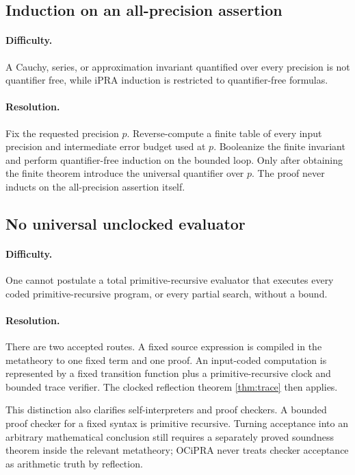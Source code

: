 \subsection{Induction on an all-precision assertion}

\paragraph{Difficulty.}
A Cauchy, series, or approximation invariant quantified over every precision is not quantifier free, while iPRA induction is restricted to quantifier-free formulas.

\paragraph{Resolution.}
Fix the requested precision $p$.  Reverse-compute a finite table of every input precision and intermediate error budget used at $p$.  Booleanize the finite invariant and perform quantifier-free induction on the bounded loop.  Only after obtaining the finite theorem introduce the universal quantifier over $p$.  The proof never inducts on the all-precision assertion itself.

\subsection{No universal unclocked evaluator}

\paragraph{Difficulty.}
One cannot postulate a total primitive-recursive evaluator that executes every coded primitive-recursive program, or every partial search, without a bound.

\paragraph{Resolution.}
There are two accepted routes.  A fixed source expression is compiled in the metatheory to one fixed  term and one proof.  An input-coded computation is represented by a fixed transition function plus a primitive-recursive clock and bounded trace verifier.  The clocked reflection theorem \cref{thm:trace} then applies.

This distinction also clarifies self-interpreters and proof checkers.  A bounded proof checker for a fixed syntax is primitive recursive.  Turning acceptance into an arbitrary mathematical conclusion still requires a separately proved soundness theorem inside the relevant metatheory; OCiPRA never treats checker acceptance as arithmetic truth by reflection.

